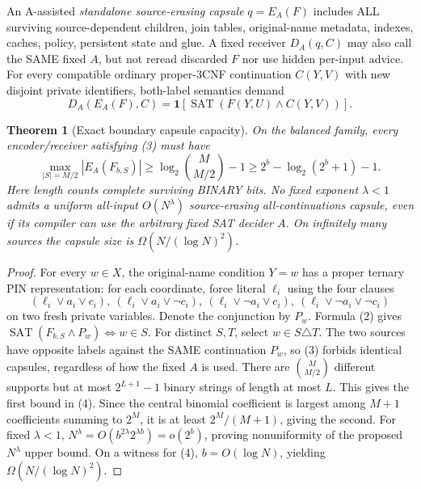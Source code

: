 \documentclass[11pt]{article}
\newtheorem{theorem}{Theorem}
\begin{document}
An A-assisted \emph{standalone source-erasing capsule}
$q=E_A(F)$ includes ALL surviving source-dependent
children, join tables, original-name metadata,
indexes, caches, policy, persistent state and glue.
A fixed receiver $D_A(q,C)$ may also call the SAME
fixed $A$, but not reread discarded $F$ nor use
hidden per-input advice. For every compatible
ordinary proper-3CNF continuation $C(Y,V)$
with new disjoint private identifiers, both-label
semantics demand
\[
D_A(E_A(F),C)=
\mathbf1[\operatorname{SAT}(F(Y,U)\wedge C(Y,V))].
\tag{3}
\]
\begin{theorem}[Exact boundary capsule capacity]
On the balanced family, every encoder/receiver
satisfying (3) must have
\[
\max_{|S|=M/2}|E_A(F_{b,S})|
\ge\log_2 {M\choose M/2}-1
\ge2^b-\log_2(2^b+1)-1.
\tag{4}
\]
Here length counts complete surviving BINARY bits.
No fixed exponent $\lambda<1$ admits a
uniform all-input $O(N^\lambda)$ source-erasing
all-continuations capsule, even if its compiler
can use the arbitrary fixed SAT decider $A$.
On infinitely many sources the capsule size is
$\Omega(N/(\log N)^2)$.
\end{theorem}
\begin{proof}
For every $w\in X$, the original-name condition
$Y=w$ has a proper ternary PIN representation:
for each coordinate, force literal $\ell_i$
using the four clauses
\[
(\ell_i\vee a_i\vee c_i),\
(\ell_i\vee a_i\vee\neg c_i),\
(\ell_i\vee\neg a_i\vee c_i),\
(\ell_i\vee\neg a_i\vee\neg c_i)
\]
on two fresh private variables. Denote the
conjunction by $P_w$. Formula (2) gives
$\operatorname{SAT}(F_{b,S}\wedge P_w)
\iff w\in S$. For distinct $S,T$, select
$w\in S\triangle T$. The two sources
have opposite labels against the SAME
continuation $P_w$, so (3) forbids identical
capsules, regardless of how the fixed $A$ is
used. There are $\binom{M}{M/2}$
different supports but at most $2^{L+1}-1$
binary strings of length at most $L$.
This gives the first bound in (4).
Since the central binomial coefficient is
largest among $M+1$ coefficients summing
to $2^M$, it is at least $2^M/(M+1)$,
giving the second. For fixed $\lambda<1$,
$N^\lambda=O(b^{2\lambda}2^{\lambda b})
=o(2^b)$, proving nonuniformity of the
proposed $N^\lambda$ upper bound. On
a witness for (4), $b=O(\log N)$,
yielding $\Omega(N/(\log N)^2)$.
\end{proof}
\end{document}
